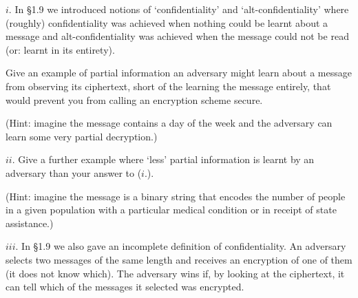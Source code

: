 \documentclass[final]{problemset}
\begin{document}


    $i$. In \S 1.9 we introduced notions of `confidentiality' and `alt-confidentiality' where (roughly) confidentiality was achieved when nothing could be learnt about a message and alt-confidentiality was achieved when the message could not be read (or: learnt in its entirety).

	Give an example of partial information an adversary might learn about a message from observing its ciphertext, short of the learning the message entirely, that would prevent you from calling an encryption scheme secure.

	(Hint: imagine the message contains a day of the week and the adversary can learn some very partial decryption.)

	
	$ii$. Give a further example where `less' partial information is learnt by an adversary than your answer to ($i$.).

	(Hint: imagine the message is a binary string that encodes the number of people in a given population with a particular medical condition or in receipt of state assistance.)


    $iii$. In \S 1.9 we also gave an incomplete definition of confidentiality.
	An adversary selects two messages of the same length and receives an encryption of one of them (it does not know which).
	The adversary wins if, by looking at the ciphertext, it can tell which of the messages it selected was encrypted.
\end{document}
